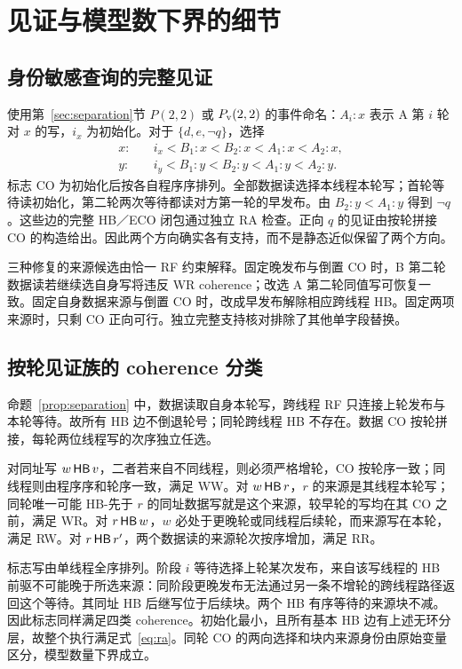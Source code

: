 \section{见证与模型数下界的细节}
\subsection{身份敏感查询的完整见证}\label{app:witness}
使用第~\ref{sec:separation}节 $P(2,2)$ 或 $P_{\mathrm v}(2,2)$ 的事件命名：$A_i:x$ 表示 A 第 $i$ 轮对 $x$ 的写，$i_x$ 为初始化。对于 $\{d,e,\neg q\}$，选择
\begin{align*}
 x:&\quad i_x < B_1:x < B_2:x < A_1:x < A_2:x,\\
 y:&\quad i_y < B_1:y < B_2:y < A_1:y < A_2:y.
\end{align*}
标志 CO 为初始化后按各自程序序排列。全部数据读选择本线程本轮写；首轮等待读初始化，第二轮两次等待都读对方第一轮的早发布。由 $B_2:y<A_1:y$ 得到 $\neg q$。这些边的完整 HB／ECO 闭包通过独立 RA 检查。正向 $q$ 的见证由按轮拼接 CO 的构造给出。因此两个方向确实各有支持，而不是静态近似保留了两个方向。

三种修复的来源候选由恰一 RF 约束解释。固定晚发布与倒置 CO 时，B 第二轮数据读若继续选自身写将违反 WR coherence；改选 A 第二轮同值写可恢复一致。固定自身数据来源与倒置 CO 时，改成早发布解除相应跨线程 HB。固定两项来源时，只剩 CO 正向可行。独立完整支持核对排除了其他单字段替换。

\subsection{按轮见证族的 coherence 分类}\label{app:models}
命题~\ref{prop:separation} 中，数据读取自身本轮写，跨线程 RF 只连接上轮发布与本轮等待。故所有 HB 边不倒退轮号；同轮跨线程 HB 不存在。数据 CO 按轮拼接，每轮两位线程写的次序独立任选。

对同址写 $w\,\mathsf{HB}\,v$，二者若来自不同线程，则必须严格增轮，CO 按轮序一致；同线程则由程序序和轮序一致，满足 WW。对 $w\,\mathsf{HB}\,r$，$r$ 的来源是其线程本轮写；同轮唯一可能 HB-先于 $r$ 的同址数据写就是这个来源，较早轮的写均在其 CO 之前，满足 WR。对 $r\,\mathsf{HB}\,w$，$w$ 必处于更晚轮或同线程后续轮，而来源写在本轮，满足 RW。对 $r\,\mathsf{HB}\,r'$，两个数据读的来源轮次按序增加，满足 RR。

标志写由单线程全序排列。阶段 $i$ 等待选择上轮某次发布，来自该写线程的 HB 前驱不可能晚于所选来源：同阶段更晚发布无法通过另一条不增轮的跨线程路径返回这个等待。其同址 HB 后继写位于后续块。两个 HB 有序等待的来源块不减。因此标志同样满足四类 coherence。初始化最小，且所有基本 HB 边有上述无环分层，故整个执行满足式~\eqref{eq:ra}。同轮 CO 的两向选择和块内来源身份由原始变量区分，模型数量下界成立。

